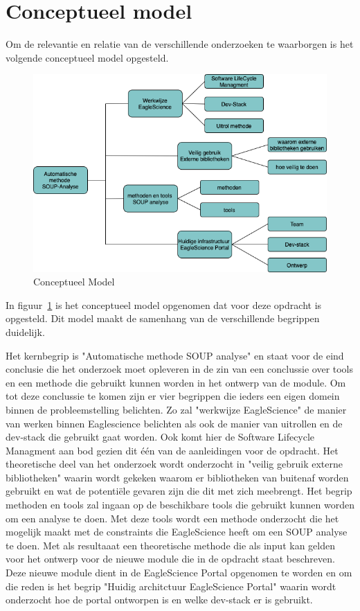 \section{Conceptueel model}\label{sec:conceptueel-model}
Om de relevantie en relatie van de verschillende onderzoeken te waarborgen is het volgende conceptueel model opgesteld.
\begin{figure}[H]
    \centering
    \includegraphics[width=12cm]{gfx/Conceptueel Model}
    \caption{Conceptueel Model}
    \label{fig:ConceptueelModel}
\end{figure}

In figuur~\ref{fig:ConceptueelModel} is het conceptueel model opgenomen dat voor deze opdracht is opgesteld. Dit model maakt de samenhang van de verschillende begrippen duidelijk.

Het kernbegrip is "Automatische methode SOUP analyse" en staat voor de eind conclusie die het onderzoek moet opleveren in de zin van een conclussie over tools en een methode die gebruikt kunnen worden in het ontwerp van de module. Om tot deze conclussie te komen zijn er vier begrippen die ieders een eigen domein binnen de probleemstelling belichten. Zo zal "werkwijze EagleScience" de manier van werken binnen Eaglescience belichten als ook de manier van uitrollen en de dev-stack die gebruikt gaat worden. Ook komt hier de Software Lifecycle Managment aan bod gezien dit één van de aanleidingen voor de opdracht. Het theoretische deel van het onderzoek wordt onderzocht in "veilig gebruik externe bibliotheken" waarin wordt gekeken waarom er bibliotheken van buitenaf worden gebruikt en wat de potentiële gevaren zijn die dit met zich meebrengt. Het begrip methoden en tools zal ingaan op de beschikbare tools die gebruikt kunnen worden om een analyse te doen. Met deze tools wordt een methode onderzocht die het mogelijk maakt met de constraints die EagleScience heeft om een SOUP analyse te doen. Met als resultaaat een theoretische methode die als input kan gelden voor het ontwerp voor de nieuwe module die in de opdracht staat beschreven. Deze nieuwe module dient in de EagleScience Portal opgenomen te worden en om die reden is het begrip "Huidig architctuur EagleScience Portal" waarin wordt onderzocht hoe de portal ontworpen is en welke dev-stack er is gebruikt.


